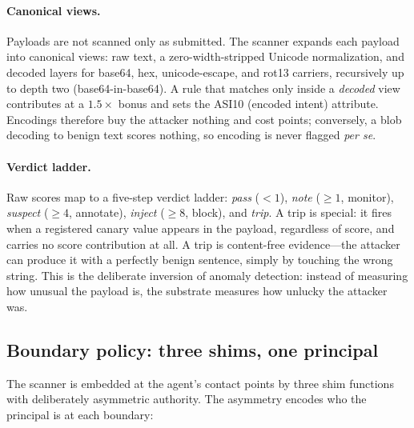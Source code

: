 \documentclass[11pt,a4paper]{article}
\begin{document}
\paragraph{Canonical views.} Payloads are not scanned only as submitted.
The scanner expands each payload into canonical views: raw text, a
zero-width-stripped Unicode normalization, and decoded layers for
base64, hex, unicode-escape, and rot13 carriers, recursively up to depth two
(base64-in-base64). A rule that matches only inside a \emph{decoded} view
contributes at a $1.5\times$ bonus and sets the ASI10 (encoded intent)
attribute. Encodings therefore buy the attacker nothing and cost points;
conversely, a blob decoding to benign text scores nothing, so encoding is
never flagged \emph{per se}.

\paragraph{Verdict ladder.} Raw scores map to a five-step verdict ladder:
\emph{pass} ($<1$), \emph{note} ($\ge 1$, monitor), \emph{suspect}
($\ge 4$, annotate), \emph{inject} ($\ge 8$, block), and \emph{trip}. A
trip is special: it fires when a registered canary value appears in the
payload, regardless of score, and carries no score contribution at all. A
trip is content-free evidence---the attacker can produce it with a
perfectly benign sentence, simply by touching the wrong string. This is
the deliberate inversion of anomaly detection: instead of measuring how
unusual the payload is, the substrate measures how unlucky the attacker
was.

\subsection{Boundary policy: three shims, one principal}

The scanner is embedded at the agent's contact points by three shim
functions with deliberately asymmetric authority. The asymmetry encodes who
the principal is at each boundary:
\end{document}
